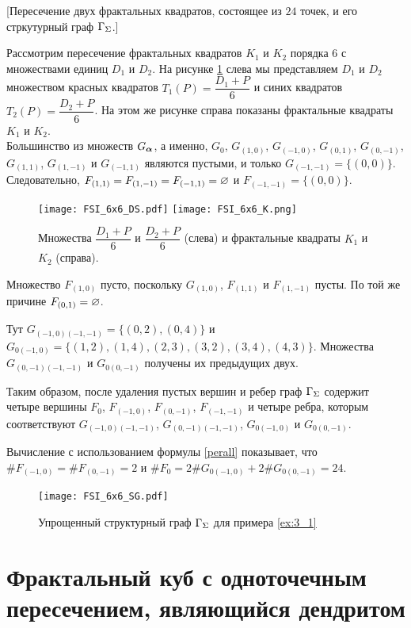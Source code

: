\begin{example}\label{ex:3_1}
[Пересечение двух фрактальных квадратов, состоящее из $24$ точек, и его стркутурный граф $\Gamma_\Sigma$.]

Рассмотрим пересечение фрактальных квадратов $K_1$ и $K_2$ порядка $6$ с множествами единиц $D_1$ и $D_2$.
На рисунке \ref{fig:FSI_6x6_DSK} слева мы представляем $D_1$ и $D_2$ множеством красных квадратов $T_1(P)=\dfrac{D_1+P}{6}$ и синих квадратов $T_2(P)=\dfrac{D_2+P}{6}$.
На этом же рисунке справа показаны фрактальные квадраты $K_1$ и $K_2$. \\

Большинство из множеств $G_{\bm{\alpha}}$, а именно, 
$G_0$, $G_{(1,0)}$, $G_{(-1,0)}$, $G_{(0,1)}$, $G_{(0,-1)}$, $G_{(1,1)}$, $G_{(1,-1)}$ и $G_{(-1,1)}$ являются пустыми, и только $G_{(-1,-1)}=\{(0,0)\}$. 
Следовательно, $F_{(1,1)}=F_{(1,-1)}=F_{(-1,1)}=\varnothing$ и $F_{(-1,-1)}=\{(0,0)\}$.

\begin{figure}[H]
    \texttt{[image: FSI\_6x6\_DS.pdf]}
    \hfill
    \texttt{[image: FSI\_6x6\_K.png]}
    \caption{Множества $\dfrac{D_1+P}{6}$ и $\dfrac{D_2+P}{6}$ (слева) и фрактальные квадраты $K_1$ и $K_2$ (справа).}
    \label{fig:FSI_6x6_DSK}
\end{figure}

Множество $F_{(1,0)}$ пусто, поскольку $G_{(1,0)}$, $F_{(1,1)}$ и $F_{(1,-1)}$ пусты. 
По той же причине $F_{(0,1)}=\varnothing$.

Тут $G_{(-1,0)(-1,-1)}=\{(0,2), (0,4)\}$ и $G_{0(-1,0)}=\{(1,2), (1,4),(2,3), (3,2), (3,4), (4,3)\}$.
Множества $G_{(0,-1)(-1,-1)}$ и $G_{0(0,-1)}$ получены их предыдущих двух.

Таким образом, после удаления пустых вершин и ребер
граф $\Gamma_\Sigma$ содержит четыре вершины  $F_0$, $F_{(-1,0)}$, $F_{(0,-1)}$, $F_{(-1,-1)}$ и четыре ребра, которым соответствуют $G_{(-1,0)(-1,-1)}$, $ G_{(0,-1)(-1,-1)}$, $G_{0(-1,0)}$ и $G_{0(0,-1)}$.

Вычисление с использованием формулы \eqref{perall} показывает, что
$\#F_{(-1,0)}=\#F_{(0,-1)}=2$ и $\#F_0=2 \#G_{0(-1,0)}+2\#G_{0(0,-1)}=24.$

\begin{figure}[H]
    \centering
    \texttt{[image: FSI\_6x6\_SG.pdf]}
    \caption{Упрощенный структурный граф $\Gamma_\Sigma$ для примера \ref{ex:3_1}}
\end{figure} 
\end{example} 




\section{Фрактальный куб с одноточечным пересечением, являющийся дендритом}


